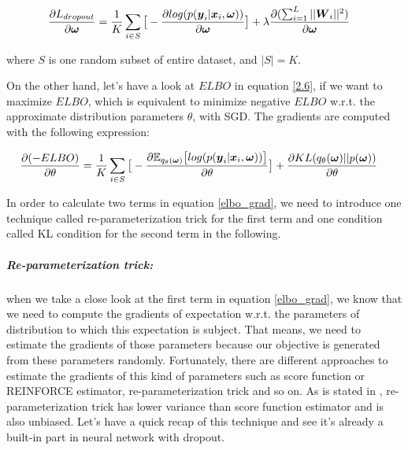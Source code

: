 \begin{equation}
\begin{aligned} \label{dropout_grad}
\frac{\partial L_{dropout}}{\partial \boldsymbol \omega} &=\frac{1}{K}\sum_{i \in S}\big[-\frac{\partial log(p(\boldsymbol y_{i}| \boldsymbol x_{i}, \boldsymbol \omega))}{\partial \boldsymbol \omega}\big] + \lambda\frac{\partial (\sum_{i=1}^{L} ||\boldsymbol W_{i}||^{2})}{\partial \boldsymbol \omega}
\end{aligned}
\end{equation}

where $S$ is one random subset of entire dataset, and $|S| = K$.

On the other hand, let's have a look at $ELBO$ in equation \ref{2.6}, if we want to maximize $ELBO$, which is equivalent to minimize negative $ELBO$ w.r.t. the approximate distribution parameters $\theta$, with SGD. The gradients are computed with the following expression:

\begin{equation}
\begin{aligned} \label{elbo_grad}
\frac{\partial (-ELBO)}{\partial \theta} &=\frac{1}{K}\sum_{i \in S}\big[-\frac{\partial \mathbb E_{q_{\theta}(\boldsymbol \omega)} \big[log(p(\boldsymbol y_{i}| \boldsymbol x_{i}, \boldsymbol \omega))\big]}{\partial \theta}\big] + \frac{\partial KL(q_{\theta}(\boldsymbol \omega)||p(\boldsymbol \omega))}{\partial \theta}
\end{aligned}
\end{equation}

In order to calculate two terms in equation \ref{elbo_grad}, we need to introduce one technique called re-parameterization trick\cite{kingma2013auto} for the first term and one condition called KL condition\cite{gal2016uncertainty} for the second term in the following.

\subparagraph{Re-parameterization trick:} when we take a close look at the first term in equation \ref{elbo_grad}, we know that we need to compute the gradients of expectation w.r.t. the parameters of distribution to which this expectation is subject. That means, we need to estimate the gradients of those parameters because our objective is generated from these parameters randomly. Fortunately, there are different approaches to estimate the gradients of this kind of parameters such as score function or REINFORCE estimator\cite{williams1992simple}, re-parameterization trick \cite{kingma2013auto} and so on. As is stated in \cite{kingma2013auto}, re-parameterization trick has lower variance than score function estimator and is also unbiased. Let's have a quick recap of this technique and see it's already a built-in part in neural network with dropout.

